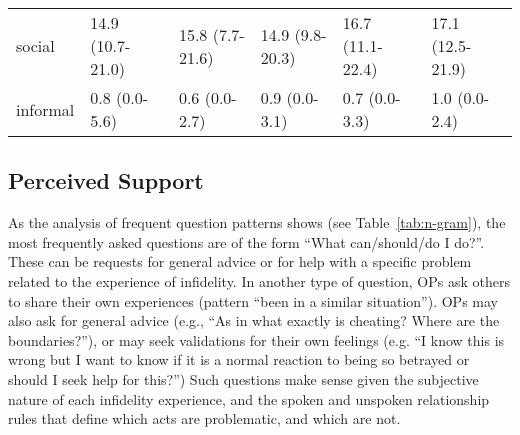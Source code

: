\begin{table*}
\begin{tabular}{l|l|l|l|l|l}
social & 14.9 (10.7-21.0) & 15.8 (7.7-21.6) & 14.9 (9.8-20.3) & 16.7 (11.1-22.4) & 17.1 (12.5-21.9) \\
informal & 0.8 (0.0-5.6) & 0.6 (0.0-2.7) & 0.9 (0.0-3.1) & 0.7 (0.0-3.3) & 1.0 (0.0-2.4) \\
\hline
\end{tabular}
\end{table*}


\subsection{Perceived Support}

As the analysis of frequent question patterns shows (see Table~\ref{tab:n-gram}), the most frequently asked questions are of the form ``What can/should/do I do?''. These can be requests for general advice or for help with a specific problem related to the experience of infidelity. In another type of question, OPs ask others to share their own experiences (pattern ``been in a similar situation''). OPs may also ask for general advice (e.g., ``As in what exactly is cheating? Where are the boundaries?''), or may seek validations for their own feelings (e.g. ``I know this is wrong but I want to know if it is a normal reaction to being so betrayed or should I seek help for this?'')  Such questions make sense given the subjective nature of each infidelity experience, and the spoken and unspoken relationship rules that define which acts are problematic, and which are not. 

